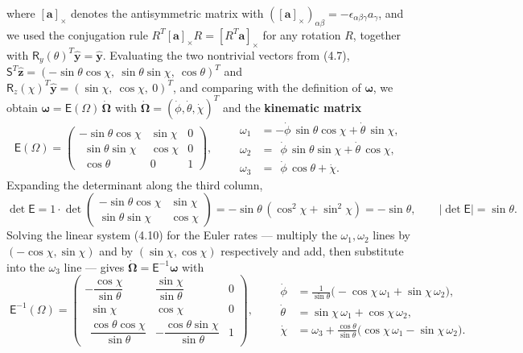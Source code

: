 where $[\mathbf a]_\times$ denotes the antisymmetric matrix with $([\mathbf a]_\times)_{\alpha\beta}=-\epsilon_{\alpha\beta\gamma}a_\gamma$, and we used the conjugation rule $R^{T}[\mathbf a]_\times R=[R^{T}\mathbf a]_\times$ for any rotation $R$, together with $\mathsf R_y(\theta)^{T}\hat{\mathbf y}=\hat{\mathbf y}$. Evaluating the two nontrivial vectors from (4.7), $\mathsf S^{T}\hat{\mathbf z}=(-\sin\theta\cos\chi,\ \sin\theta\sin\chi,\ \cos\theta)^{T}$ and $\mathsf R_z(\chi)^{T}\hat{\mathbf y}=(\sin\chi,\ \cos\chi,\ 0)^{T}$, and comparing with the definition of $\boldsymbol\omega$, we obtain $\boldsymbol\omega=\mathsf E(\Omega)\,\dot{\boldsymbol\Omega}$ with $\dot{\boldsymbol\Omega}=(\dot\phi,\dot\theta,\dot\chi)^{T}$ and the \textbf{kinematic matrix}
\begin{equation}
\boxed{\;
\mathsf E(\Omega)=
\begin{pmatrix}
-\sin\theta\cos\chi & \sin\chi & 0\\[2pt]
\ \ \sin\theta\sin\chi & \cos\chi & 0\\[2pt]
\ \ \cos\theta & 0 & 1
\end{pmatrix},\qquad
\begin{aligned}
\omega_1&=-\dot\phi\,\sin\theta\cos\chi+\dot\theta\,\sin\chi,\\
\omega_2&=\ \ \dot\phi\,\sin\theta\sin\chi+\dot\theta\,\cos\chi,\\
\omega_3&=\ \ \dot\phi\,\cos\theta+\dot\chi .
\end{aligned}\;}\tag{4.10}
\end{equation}
Expanding the determinant along the third column,
\begin{equation}
\det\mathsf E
=1\cdot\det\!\begin{pmatrix}-\sin\theta\cos\chi&\sin\chi\\ \sin\theta\sin\chi&\cos\chi\end{pmatrix}
=-\sin\theta\,(\cos^2\chi+\sin^2\chi)=-\sin\theta,\qquad |\det\mathsf E|=\sin\theta . \tag{4.11}
\end{equation}
Solving the linear system (4.10) for the Euler rates --- multiply the $\omega_1,\omega_2$ lines by $(-\cos\chi,\sin\chi)$ and by $(\sin\chi,\cos\chi)$ respectively and add, then substitute into the $\omega_3$ line --- gives $\dot{\boldsymbol\Omega}=\mathsf E^{-1}\boldsymbol\omega$ with
\begin{equation}
\boxed{\;
\mathsf E^{-1}(\Omega)=
\begin{pmatrix}
-\dfrac{\cos\chi}{\sin\theta} & \dfrac{\sin\chi}{\sin\theta} & 0\\[10pt]
\ \ \sin\chi & \cos\chi & 0\\[6pt]
\ \ \dfrac{\cos\theta\cos\chi}{\sin\theta} & -\dfrac{\cos\theta\sin\chi}{\sin\theta} & 1
\end{pmatrix},
\qquad
\begin{aligned}
\dot\phi&=\tfrac{1}{\sin\theta}\bigl(-\cos\chi\,\omega_1+\sin\chi\,\omega_2\bigr),\\
\dot\theta&=\sin\chi\,\omega_1+\cos\chi\,\omega_2,\\
\dot\chi&=\omega_3+\tfrac{\cos\theta}{\sin\theta}\bigl(\cos\chi\,\omega_1-\sin\chi\,\omega_2\bigr).
\end{aligned}\;}\tag{4.12}
\end{equation}
